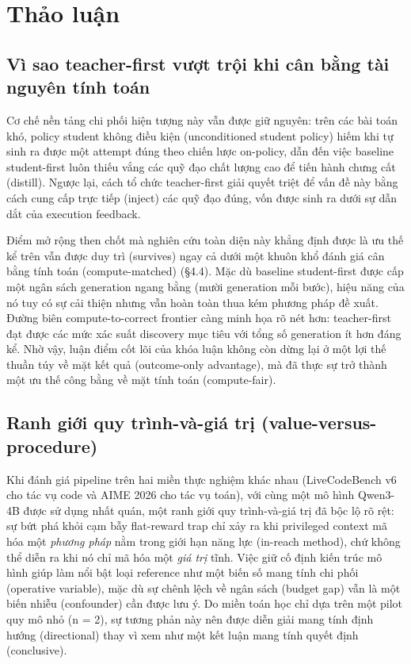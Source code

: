 \chapter{Thảo luận}\label{chapter-5-discussion}

\section{Vì sao teacher-first vượt trội khi cân bằng tài nguyên tính toán}\label{why-teacher-first-wins-now-compute-fair}

Cơ chế nền tảng chi phối hiện tượng này vẫn được giữ nguyên: trên các bài toán khó, policy student không điều kiện (unconditioned student policy) hiếm khi tự sinh ra được một attempt đúng theo chiến lược on-policy, dẫn đến việc baseline student-first luôn thiếu vắng các quỹ đạo chất lượng cao để tiến hành chưng cất (distill). Ngược lại, cách tổ chức teacher-first giải quyết triệt để vấn đề này bằng cách cung cấp trực tiếp (inject) các quỹ đạo đúng, vốn được sinh ra dưới sự dẫn dắt của execution feedback.

Điểm mở rộng then chốt mà nghiên cứu toàn diện này khẳng định được là ưu thế kể trên vẫn được duy trì (survives) ngay cả dưới một khuôn khổ đánh giá cân bằng tính toán (compute-matched) (§4.4). Mặc dù baseline student-first được cấp một ngân sách generation ngang bằng (mười generation mỗi bước), hiệu năng của nó tuy có sự cải thiện nhưng vẫn hoàn toàn thua kém phương pháp đề xuất. Đường biên compute-to-correct frontier càng minh họa rõ nét hơn: teacher-first đạt được các mức xác suất discovery mục tiêu với tổng số generation ít hơn đáng kể. Nhờ vậy, luận điểm cốt lõi của khóa luận không còn dừng lại ở một lợi thế thuần túy về mặt kết quả (outcome-only advantage), mà đã thực sự trở thành một ưu thế công bằng về mặt tính toán (compute-fair).

\section{Ranh giới quy trình-và-giá trị (value-versus-procedure)}\label{the-value-versus-procedure-boundary-validated}

Khi đánh giá pipeline trên hai miền thực nghiệm khác nhau (LiveCodeBench v6 cho tác vụ code và AIME 2026 cho tác vụ toán), với cùng một mô hình Qwen3-4B được sử dụng nhất quán, một ranh giới quy trình-và-giá trị đã bộc lộ rõ rệt: sự bứt phá khỏi cạm bẫy flat-reward trap chỉ xảy ra khi privileged context mã hóa một \emph{phương pháp} nằm trong giới hạn năng lực (in-reach method), chứ không thể diễn ra khi nó chỉ mã hóa một \emph{giá trị} tĩnh. Việc giữ cố định kiến trúc mô hình giúp làm nổi bật loại reference như một biến số mang tính chi phối (operative variable), mặc dù sự chênh lệch về ngân sách (budget gap) vẫn là một biến nhiễu (confounder) cần được lưu ý. Do miền toán học chỉ dựa trên một pilot quy mô nhỏ (n = 2), sự tương phản này nên được diễn giải mang tính định hướng (directional) thay vì xem như một kết luận mang tính quyết định (conclusive).

